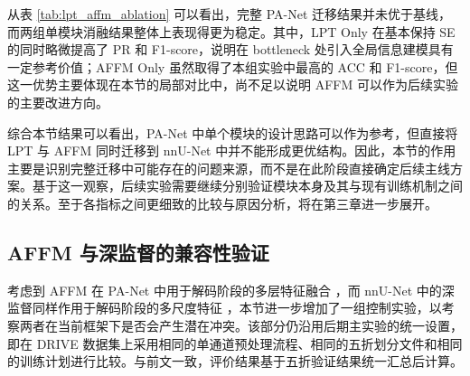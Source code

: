 \documentclass[a4paper,12pt]{article}
\begin{document}
\begin{table}[htbp]
\centering
\caption{LPT 与 AFFM 消融实验结果对比}
\label{tab:lpt_affm_ablation}
\end{table}

从表 \ref{tab:lpt_affm_ablation} 可以看出，完整 PA-Net 迁移结果并未优于基线，而两组单模块消融结果整体上表现得更为稳定。其中，LPT Only 在基本保持 SE 的同时略微提高了 PR 和 F1-score，说明在 bottleneck 处引入全局信息建模具有一定参考价值；AFFM Only 虽然取得了本组实验中最高的 ACC 和 F1-score，但这一优势主要体现在本节的局部对比中，尚不足以说明 AFFM 可以作为后续实验的主要改进方向。

综合本节结果可以看出，PA-Net 中单个模块的设计思路可以作为参考，但直接将 LPT 与 AFFM 同时迁移到 nnU-Net 中并不能形成更优结构。因此，本节的作用主要是识别完整迁移中可能存在的问题来源，而不是在此阶段直接确定后续主线方案。基于这一观察，后续实验需要继续分别验证模块本身及其与现有训练机制之间的关系。至于各指标之间更细致的比较与原因分析，将在第三章进一步展开。

\subsection{AFFM 与深监督的兼容性验证}

考虑到 AFFM 在 PA-Net 中用于解码阶段的多层特征融合 \cite{luo2025panet}，而 nnU-Net 中的深监督同样作用于解码阶段的多尺度特征 \cite{isensee2021nnunet,lee2015dsn}，本节进一步增加了一组控制实验，以考察两者在当前框架下是否会产生潜在冲突。该部分仍沿用后期主实验的统一设置，即在 DRIVE 数据集上采用相同的单通道预处理流程、相同的五折划分文件和相同的训练计划进行比较。与前文一致，评价结果基于五折验证结果统一汇总后计算。
\end{document}
